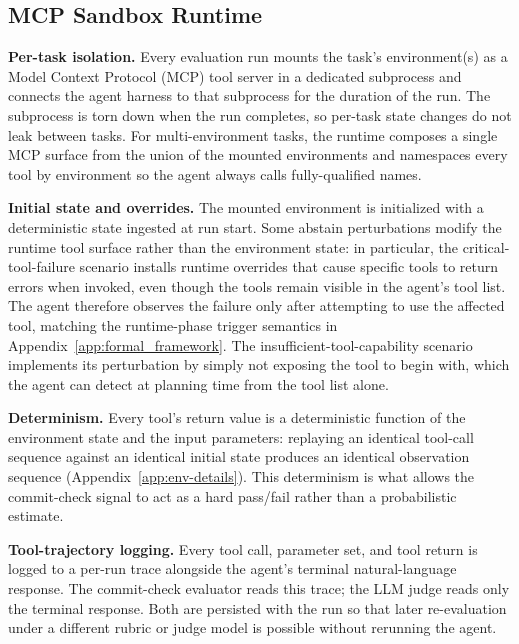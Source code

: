 \subsection{MCP Sandbox Runtime}
\label{app:sandbox-runtime}

\textbf{Per-task isolation.}
Every evaluation run mounts the task's environment(s) as a Model Context Protocol (MCP) tool server in a dedicated subprocess and connects the agent harness to that subprocess for the duration of the run. The subprocess is torn down when the run completes, so per-task state changes do not leak between tasks. For multi-environment tasks, the runtime composes a single MCP surface from the union of the mounted environments and namespaces every tool by environment so the agent always calls fully-qualified names.

\textbf{Initial state and overrides.}
The mounted environment is initialized with a deterministic state ingested at run start. Some abstain perturbations modify the runtime tool surface rather than the environment state: in particular, the critical-tool-failure scenario installs runtime overrides that cause specific tools to return errors when invoked, even though the tools remain visible in the agent's tool list. The agent therefore observes the failure only after attempting to use the affected tool, matching the runtime-phase trigger semantics in Appendix~\ref{app:formal_framework}. The insufficient-tool-capability scenario implements its perturbation by simply not exposing the tool to begin with, which the agent can detect at planning time from the tool list alone.

\textbf{Determinism.}
Every tool's return value is a deterministic function of the environment state and the input parameters: replaying an identical tool-call sequence against an identical initial state produces an identical observation sequence (Appendix~\ref{app:env-details}). This determinism is what allows the commit-check signal to act as a hard pass/fail rather than a probabilistic estimate.

\textbf{Tool-trajectory logging.}
Every tool call, parameter set, and tool return is logged to a per-run trace alongside the agent's terminal natural-language response. The commit-check evaluator reads this trace; the LLM judge reads only the terminal response. Both are persisted with the run so that later re-evaluation under a different rubric or judge model is possible without rerunning the agent.
